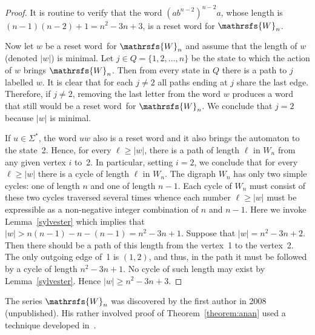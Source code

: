 \documentclass[11pt]{llncs}
\newcommand{\sw}{reset word}
\begin{document}
\begin{proof}
It is routine to verify that the word $(ab^{n-2})^{n-2}a$, whose length
is $(n-1)(n-2)+1=n^2-3n+3$, is a reset word for $\mathrsfs{W}_n$.

Now let $w$ be a \sw\ for $\mathrsfs{W}_n$ and assume that the length
of $w$ (denoted $|w|$) is minimal. Let $j\in Q=\{1,2,\dots,n\}$ be the
state to which the action of $w$ brings $\mathrsfs{W}_n$. Then from
every state in $Q$ there is a path to $j$ labelled $w$. It is clear
that for each $j\ne 2$ all paths ending at $j$ share the last edge.
Therefore, if $j\ne 2$, removing the last letter from the word $w$
produces a word that still would be a \sw\ for $\mathrsfs{W}_n$.
We conclude that $j=2$ because $|w|$ is minimal.

If $u\in\Sigma^*$, the word $uw$ also is a reset word and it also
brings the automaton to the state~2. Hence, for every $\ell\ge|w|$,
there is a path of length $\ell$ in $W_n$ from any given vertex $i$
to~2. In particular, setting $i=2$, we conclude that for every
$\ell\ge|w|$ there is a cycle of length $\ell$ in $W_n$. The digraph
$W_n$ has only two simple cycles: one of length $n$ and one of length $n-1$.
Each cycle of $W_n$ must consist of these two cycles traversed several times
whence each number $\ell\ge|w|$ must be expressible as a non-negative integer
combination of $n$ and $n-1$. Here we invoke Lemma~\ref{sylvester} which
implies that $|w|>n(n-1)-n-(n-1)=n^2-3n+1$. Suppose that $|w|=n^2-3n+2$.
Then there should be a path of this length from the vertex~1 to the vertex~2.
The only outgoing edge of~1 is $(1,2)$, and thus, in the path it must be
followed by a cycle of length $n^2-3n+1$. No cycle of such length may
exist by  Lemma~\ref{sylvester}. Hence $|w|\ge n^2-3n+3$.
\end{proof}

The series $\mathrsfs{W}_n$ was discovered by the first author in 2008
(unpublished). His rather involved proof of Theorem~\ref{theorem:anan}
used a technique developed in~\cite{AVZ}.
\end{document}
